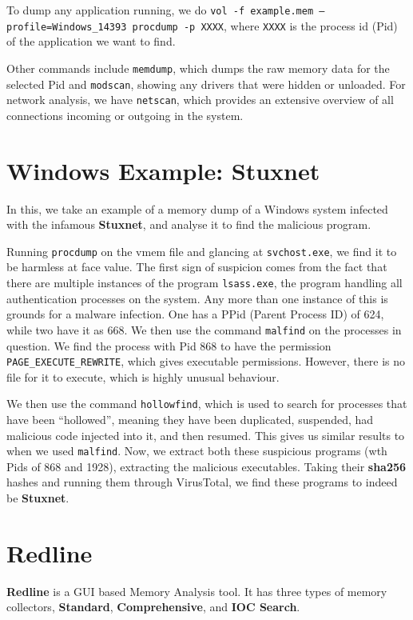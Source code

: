 \documentclass{article}
\begin{document}
To dump any application running, we do \texttt{vol -f example.mem --profile=Windows\_14393 procdump -p XXXX}, where \texttt{XXXX} is the process id (Pid) of the application we want to find.

Other commands include \texttt{memdump}, which dumps the raw memory data for the selected Pid and \texttt{modscan}, showing any drivers that were hidden or unloaded. For network analysis, we have \texttt{netscan}, which provides an extensive overview of all connections incoming or outgoing in the system.

\section{Windows Example: Stuxnet}

In this, we take an example of a memory dump of a Windows system infected with the infamous \textbf{Stuxnet}, and analyse it to find the malicious program.

Running \texttt{procdump} on the vmem file and glancing at \texttt{svchost.exe}, we find it to be harmless at face value. The first sign of suspicion comes from the fact that there are multiple instances of the program \texttt{lsass.exe}, the program handling all authentication processes on the system. Any more than one instance of this is grounds for a malware infection. One has a PPid (Parent Process ID) of 624, while two have it as 668. We then use the command \texttt{malfind} on the processes in question. We find the process with Pid 868 to have the permission \texttt{PAGE\_EXECUTE\_REWRITE}, which gives executable permissions. However, there is no file for it to execute, which is highly unusual behaviour.

We then use the command \texttt{hollowfind}, which is used to search for processes that have been ``hollowed'', meaning they have been duplicated, suspended, had malicious code injected into it, and then resumed. This gives us similar results to when we used \texttt{malfind}. Now, we extract both these suspicious programs (wth Pids of 868 and 1928), extracting the malicious executables. Taking their \textbf{sha256} hashes and running them through VirusTotal, we find these programs to indeed be \textbf{Stuxnet}.

\section{Redline}

\textbf{Redline} is a GUI based Memory Analysis tool. It has three types of memory collectors, \textbf{Standard}, \textbf{Comprehensive}, and \textbf{IOC Search}.
\end{document}
